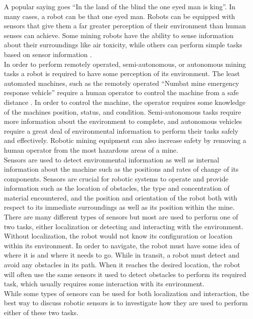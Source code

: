 A popular saying goes ``In the land of the blind the one eyed man is king''. In many cases, a robot can be that one eyed man. Robots can be equipped with sensors that give them a far greater perception of their environment than human senses can achieve. Some mining robots have the ability to sense information about their surroundings like air toxicity, while others can perform simple tasks based on sensor information \cite{uground}.\\

In order to perform remotely operated, semi-autonomous, or autonomous mining tasks a robot is required to have some perception of its environment. The least automated machines, such as the remotely operated ``Numbat mine emergency response vehicle'' require a human operator to control the machine from a safe distance \cite{numbat}. In order to control the machine, the operator requires some knowledge of the machines position, status, and condition. Semi-autonomous tasks require more information about the environment to complete, and autonomous vehicles require a great deal of environmental information to perform their tasks safely and effectively. Robotic mining equipment can also increase safety by removing a human operator from the most hazardous areas of a mine.\\

Sensors are used to detect environmental information as well as internal information about the machine such as the positions and rates of change of its components. Sensors are crucial for robotic systems to operate and provide information such as the location of obstacles, the type and concentration of material encountered, and the position and orientation of the robot both with respect to its immediate surroundings as well as its position within the mine. There are many different types of sensors but most are used to perform one of two tasks, either localization or detecting and interacting with the environment. Without localization, the robot would not know its configuration or location within its environment. In order to navigate, the robot must have some idea of where it is and where it needs to go. While in transit, a robot must detect and avoid any obstacles in its path. When it reaches the desired location, the robot will often use the same sensors it used to detect obstacles to perform its required task, which usually requires some interaction with its environment.\\

While some types of sensors can be used for both localization and interaction, the best way to discuss robotic sensors is to investigate how they are used to perform either of these two tasks.\\

